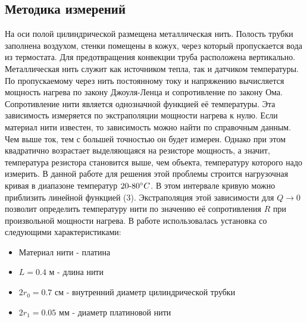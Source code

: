 	\subsection*{Методика измерений}
	На оси полой цилиндрической размещена металлическая нить. Полость трубки заполнена воздухом, стенки помещены в кожух, через который пропускается вода из термостата. Для предотвращения конвекции труба расположена вертикально.\n\n
	Металлическая нить служит как источником тепла, так и датчиком температуры.\n\n
	По пропускаемому через нить постоянному току и напряжению вычисляется мощность нагрева по закону Джоуля-Ленца и сопротивление по закону Ома.\n\n
	Сопротивление нити является однозначной функцией её температуры. Эта зависимость измеряется по экстраполяции мощности нагрева к нулю. Если материал нити известен, то зависимость можно найти по справочным данным.\n\n
	Чем выше ток, тем с большей точностью он будет измерен. Однако при этом квадратично возрастает выделяющаяся на резисторе мощность, а значит, температура резистора становится выше, чем объекта, температуру которого надо измерить.\n\n
	В данной работе для решения этой проблемы строится нагрузочная кривая в диапазоне температур $20\text{-}80 ^\circ C$. В этом интервале кривую можно приблизить линейной функцией (3). Экстраполяция этой зависимости для $Q \rightarrow 0$ позволит определить температуру нити по значению её сопротивления $R$ при произвольной мощности нагрева.\n\n
	В работе использовалась установка со следующими характеристиками:
	\begin{itemize}
	\item Материал нити - платина
	\item $L = 0.4$ м - длина нити
	\item $2r_0 = 0.7$ см - внутренний диаметр цилиндрической трубки
	\item $2r_1 = 0.05$ мм - диаметр платиновой нити
	\end{itemize}
	\newpage
